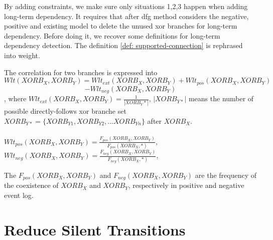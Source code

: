 By adding constraints, we make sure only situations 1,2,3 happen when adding long-term dependency. It requires that after dfg method considers the negative, positive and existing model to delete the unused xor branches for long-term dependency. 
Before doing it, we recover some definitions for long-term dependency detection. 
The definition \ref{def: supported-connection} is rephrased into weight. 
\begin{definition} The correlation for two branches is expressed into
	\[Wlt(XORB_X,XORB_Y)= Wlt_{ext}(XORB_X, XORB_Y) + Wlt_{pos}(XORB_X, XORB_Y)\] \[ -Wlt_{neg}(XORB_X, XORB_Y)\], where 
	$Wlt_{ext}(XORB_X, XORB_Y)= \frac{1}{|XORB_Y*|}$, $|XORB_{Y*}|$ means the number of possible  directly-follows xor branche set $XORB_{Y*}=\{XORB_{Y1}, XORB_{Y2},...XORB_{Yn} \}$ after $XORB_X$. \\ \\
	$Wlt_{pos}(XORB_X, XORB_Y)= \frac{F_{pos}(XORB_X, XORB_Y)}{F_{pos}(XORB_X, *)}$, \\
	$Wlt_{neg}(XORB_X, XORB_Y)= \frac{F_{neg}(XORB_X, XORB_Y)}{F_{neg}(XORB_X, *)}$, \\	
\end{definition}
The $F_{pos}(XORB_X, XORB_Y)$ and $F_{neg}(XORB_X, XORB_Y)$ are the frequency of the coexistence of $XORB_X$ and $XORB_Y$, respectively in positive and negative event log.
\section{Reduce Silent Transitions}

